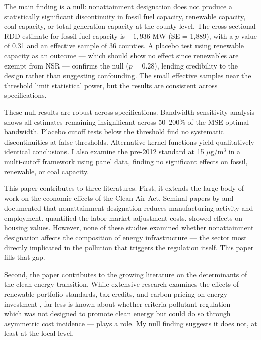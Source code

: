 \documentclass[12pt]{article}
\begin{document}
The main finding is a null: nonattainment designation does not produce a statistically significant discontinuity in fossil fuel capacity, renewable capacity, coal capacity, or total generation capacity at the county level. The cross-sectional RDD estimate for fossil fuel capacity is $-1{,}936$ MW (SE = 1,889), with a $p$-value of 0.31 and an effective sample of 36 counties. A placebo test using renewable capacity as an outcome --- which should show no effect since renewables are exempt from NSR --- confirms the null ($p = 0.28$), lending credibility to the design rather than suggesting confounding. The small effective samples near the threshold limit statistical power, but the results are consistent across specifications.

These null results are robust across specifications. Bandwidth sensitivity analysis shows all estimates remaining insignificant across 50--200\% of the MSE-optimal bandwidth. Placebo cutoff tests below the threshold find no systematic discontinuities at false thresholds. Alternative kernel functions yield qualitatively identical conclusions. I also examine the pre-2012 standard at 15 $\mu$g/m$^3$ in a multi-cutoff framework using panel data, finding no significant effects on fossil, renewable, or coal capacity.

This paper contributes to three literatures. First, it extends the large body of work on the economic effects of the Clean Air Act. Seminal papers by \citet{greenstone2002impact} and \citet{henderson1996effects} documented that nonattainment designation reduces manufacturing activity and employment. \citet{walker2013transitional} quantified the labor market adjustment costs. \citet{chay2005does} showed effects on housing values. However, none of these studies examined whether nonattainment designation affects the composition of energy infrastructure --- the sector most directly implicated in the pollution that triggers the regulation itself. This paper fills that gap.

Second, the paper contributes to the growing literature on the determinants of the clean energy transition. While extensive research examines the effects of renewable portfolio standards, tax credits, and carbon pricing on energy investment \citep{fowlie2012emissions, deschenes2017defensive}, far less is known about whether criteria pollutant regulation --- which was not designed to promote clean energy but could do so through asymmetric cost incidence --- plays a role. My null finding suggests it does not, at least at the local level.
\end{document}
